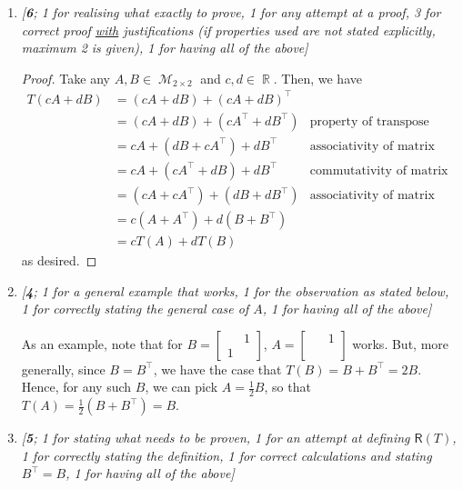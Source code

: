 \documentclass{amsart}
\theoremstyle{definition}
\theoremstyle{definition}
\DeclareMathOperator{\R}{\mathbb{R}}
\DeclareMathOperator{\1}{\mathbbm{1}}
\DeclareMathOperator{\MM}{\mathcal{M}}
\newcommand{\rng}{\mathsf{R}}
\begin{document}
\begin{enumerate}[itemsep = 2mm]
		\begin{enumerate}
			\item \textit{[\textbf{6}; 1 for realising what exactly to prove, 1 for any attempt at a proof, 3 for correct proof \uline{with} justifications (if properties used are not stated explicitly, maximum 2 is given), 1 for having all of the above]}
			
			\begin{proof}
				Take any $A,B \in \MM_{2 \times 2}$ and $c, d \in \R$. Then, we have
				\begin{align*}
				T(cA + dB) &= (cA + dB) + (cA + dB)^\intercal & \\
				&= (cA + dB) + (cA^\intercal + dB^\intercal) & \text{property of transpose under addition} \\
				&= cA + (dB + cA^\intercal) + dB^\intercal & \text{associativity of matrix addition} \\
				&= cA + ( cA^\intercal + dB ) + dB^\intercal & \text{commutativity of matrix addition} \\
				&= (cA +  cA^\intercal) + ( dB + dB^\intercal ) & \text{associativity of matrix addition} \\
				&= c(A +  A^\intercal) + d( B + B^\intercal ) & \\
				&= cT(A) + dT(B)
				\end{align*}
				as desired.
			\end{proof}
		
			\item \textit{[\textbf{4}; 1 for a general example that works, 1 for the observation as stated below, 1 for correctly stating the general case of $A$, 1 for having all of the above]}
			
			As an example, note that for $B = \begin{bmatrix} & 1 \\ 1 &  \end{bmatrix}$, $A = \begin{bmatrix} & 1 \\ \phantom{0} &  \end{bmatrix}$ works. But, more generally, since $B = B^\intercal$, we have the case that $T(B) = B+B^\intercal = 2B$. Hence, for any such $B$, we can pick $A = \frac{1}{2}B$, so that $T(A) = \frac{1}{2} (B+B^\intercal) = B$.
			
			\item \textit{[\textbf{5}; 1 for stating what needs to be proven, 1 for an attempt at defining $\rng(T)$, 1 for correctly stating the definition, 1 for correct calculations and stating $B^\intercal = B$, 1 for having all of the above]}
			

\end{enumerate}
\end{enumerate}
\end{document}
